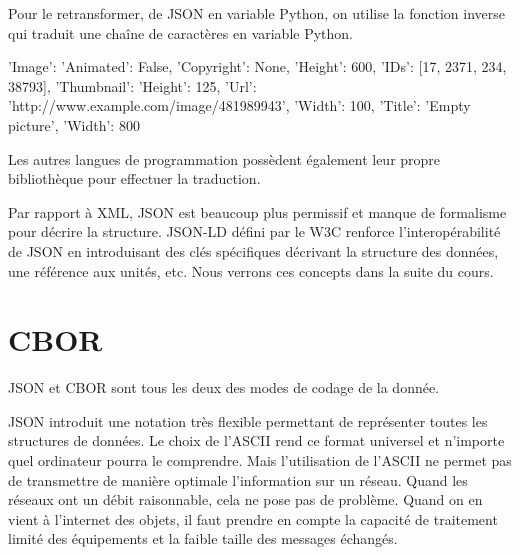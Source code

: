 Pour le retransformer, de JSON en variable Python, on utilise la fonction inverse  qui traduit une chaîne de caractères en variable Python.

\begin{termc}[backgroundcolor=\color{palerod}, language=json, basicstyle=\ttfamily\tiny]
{'Image': {'Animated': False,
           'Copyright': None,
           'Height': 600,
           'IDs': [17, 2371, 234, 38793],
           'Thumbnail': {'Height': 125,
                         'Url': 'http://www.example.com/image/481989943',
                         'Width': 100},
           'Title': 'Empty picture',
           'Width': 800}}
\end{termc}


Les autres langues de programmation possèdent également leur propre bibliothèque pour effectuer la traduction.

     \vspace{1em}

Par rapport à \ac{XML}, \ac{JSON} est beaucoup plus permissif et manque de formalisme pour décrire la structure. \ac{JSON-LD} défini par le \ac{W3C} renforce l’interopérabilité de JSON en introduisant des clés spécifiques décrivant la structure des données, une référence aux unités, etc. Nous verrons ces concepts dans la suite du cours.

\section{CBOR}

\begin{figure}
\end{figure}

\ac{JSON} et \ac{CBOR} sont tous les deux des modes de codage de la donnée.

\ac{JSON} introduit une notation très flexible permettant de représenter toutes les structures de données. Le choix de l'\acs{ASCII} rend ce format universel et n'importe quel ordinateur pourra le comprendre. Mais l'utilisation de l'\acs{ASCII} ne permet pas de transmettre de manière optimale l'information sur un réseau. Quand les réseaux ont un débit raisonnable, cela ne pose pas de problème. Quand on en vient à l'internet des objets, il faut prendre en compte la capacité de traitement limité des équipements et la faible taille des messages échangés.

     \vspace{1em}

